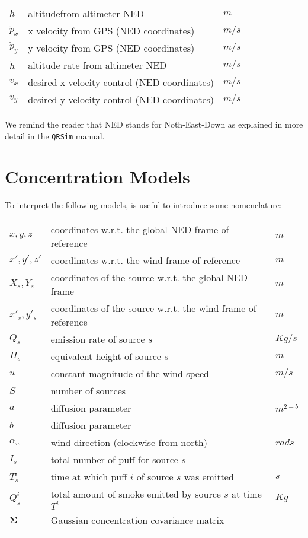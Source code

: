 \documentclass{article}
\begin{document}
\begin{table}[h]
\begin{tabular}{l l l}
     $h$& altitude\footnotemark  from altimeter NED & $m$\\
     $\dot{p}_x$ & x velocity from GPS (NED coordinates)            & $m/s$\\
     $\dot{p}_y$ & y velocity from GPS (NED coordinates)            & $m/s$\\
     $\dot{h}$    & altitude rate from altimeter NED                   & $m/s$\\
     $v_x$ & desired x velocity control (NED coordinates)            & $m/s$\\ 
     $v_y$ & desired y velocity control (NED coordinates)            & $m/s$\\
\end{tabular}
\end{table}

We remind the reader that NED stands for Noth-East-Down as explained in more detail in the \texttt{QRSim} manual.

\section{Concentration Models}

To interpret the following models, is useful to introduce some nomenclature:
\begin{longtable}{l l l}
$x,y,z$ & coordinates w.r.t. the global NED frame of reference & $m$\\
$x',y',z'$ & coordinates w.r.t. the wind frame of reference & $m$\\
$X_s,Y_s$ & coordinates of the source w.r.t. the global NED frame  & $m$\\
$x\prime_s,y'_s$ & coordinates of the source w.r.t. the wind frame of reference  & $m$\\
$Q_s$ & emission rate of source $s$ & $Kg/s$\\
$H_s$ & equivalent height of source $s$ & $m$\\
$u$ & constant magnitude of the wind speed & $m/s$\\
$S$ & number of sources & \\
$a$ & diffusion parameter & $m^{2-b}$\\
$b$ & diffusion parameter & \\
$\alpha_w$ & wind direction (clockwise from north) & $rads$\\
$I_s$ & total number of puff for source $s$ & \\
$T^i_s$ & time at which puff $i$ of source $s$ was emitted & $s$\\
$Q^i_s$ & total amount of smoke emitted by source $s$ at time $T^i$ & $Kg$\\
$\boldsymbol\Sigma$ & Gaussian concentration covariance matrix \\
\label{tab:naming2}
\end{longtable}
\end{document}
